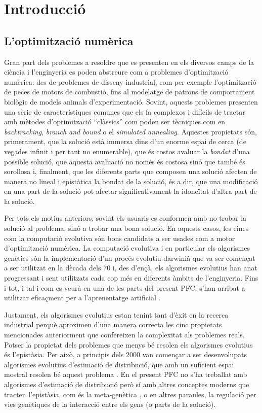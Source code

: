 \chapter{Introducció}
\section{L'optimització numèrica}
Gran part dels problemes a resoldre que es
presenten en els diversos camps de la ciència i l'enginyeria es poden abstreure
com a problemes d'optimització numèrica: des de problemes de disseny industrial,
com per exemple l'optimització de peces de motors de combustió, fins al
modelatge de patrons de comportament biològic de models animals
d'experimentació. Sovint, aquests problemes presenten una sèrie de
característiques comunes que els fa complexos i difícils de tractar amb mètodes
d'optimització ``clàssics'' com poden ser tècniques com en \emph{backtracking},
\emph{branch and bound} o el \emph{simulated annealing}. Aquestes propietats
són, primerament, que la solució està immersa dins d'un enorme espai de cerca
(de vegades infinit i per tant no enumerable), que és costos avaluar la
\emph{bondat} d'una possible solució, que aquesta avaluació no només és costosa
sinó que també és sorollosa i, finalment, que les diferents parts que composen
una solució afecten de manera no lineal i epistàtica la bondat de la solució, és
a dir, que una modificació en una part de la solució pot afectar
significativament  la idoneïtat d'altra part de la solució.

Per tots els motius anteriors, sovint els usuaris es conformen amb no trobar la
solució al problema, sinó a trobar una bona solució. En aquests casos,  les
eines com la computació evolutiva són bons candidats a ser usades com a motor
d'optimització numèrica. La computació evolutiva i en particular els algorismes
genètics són la implementació d'un procés evolutiu darwinià que va ser començat
a ser utilitzat en la dècada dels 70 \cite{H75} i, des d'ençà, els algorismes
evolutius han anat progressant i sent utilitzats cada cop més en diferents
àmbits de l'enginyeria. Fins i tot, i tal i com es veurà en una de les parts del
present PFC, s'han arribat a utilitzar eficaçment per a l'aprenentatge
artificial \cite{G89}.

Justament, els algorismes evolutius estan tenint tant d'èxit en la recerca
industrial perquè aproximen d'una manera correcta les cinc propietats
mencionades anteriorment que confereixen la complexitat als problemes reals.
Potser la propietat dels problemes que menys bé resolen els algorismes evolutius
és l'epistàsia. Per això, a principis dels 2000 van començar a ser desenvolupats
algorismes evolutius d'estimació de distribució, que amb un suficient espai
mostral resolen bé aquest problema \cite{LL02}. En el present PFC no s'ha
treballat amb algorismes d'estimació de distribució però sí amb altres conceptes
moderns que tracten l'epistàsia, com és la meta-genètica \cite{ferreira:2006}, o
en altres paraules, la regulació per vies genètiques de la interacció entre els
gens (o parts de la solució).

